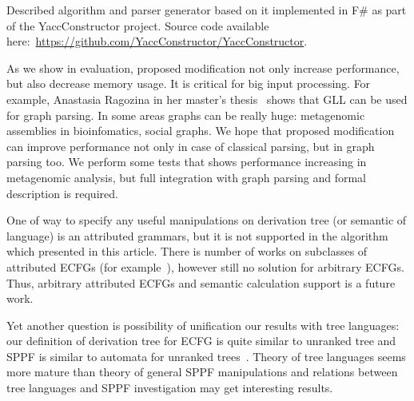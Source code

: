 \documentclass[runningheads,a4paper]{llncs}
\begin{document}
Described algorithm and parser generator based on it implemented in F\# as part of the YaccConstructor project.
Source code available here:~\url{https://github.com/YaccConstructor/YaccConstructor}.

As we show in evaluation, proposed modification not only increase performance, but also decrease memory usage. 
It is critical for big input processing.
For example, Anastasia Ragozina in her master's thesis~\cite{ragozina} shows that GLL can be used for graph parsing.  
In some areas graphs can be really huge: metagenomic assemblies in bioinfomatics, social graphs.
We hope that proposed modification can improve performance not only in case of classical parsing, but in graph parsing too. 
We perform some tests that shows performance increasing in metagenomic analysis, but full integration with graph parsing and formal description is required.

One of way to specify any useful manipulations on derivation tree (or semantic of language) is an attributed grammars, but it is not supported in the algorithm which presented in this article.
There is number of works on subclasses of attributed ECFGs (for example~\cite{AttributedELL}), however still no solution for arbitrary ECFGs.
Thus, arbitrary attributed ECFGs and semantic calculation support is a future work.

Yet another question is possibility of unification our results with tree languages: our definition of derivation tree for ECFG is quite similar to unranked tree and SPPF is similar to automata for unranked trees~\cite{TATA}.
Theory of tree languages seems more mature than theory of general SPPF manipulations and relations between tree languages and SPPF investigation may get interesting results.





\end{document}
